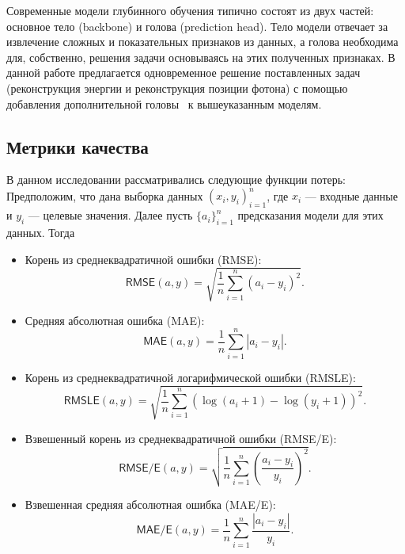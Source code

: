 \documentclass[a4paper,12pt]{extarticle}
\begin{document}
Современные модели глубинного обучения типично состоят из двух частей: основное тело (backbone) и голова (prediction head). Тело модели отвечает за извлечение сложных и показательных признаков из данных, а голова необходима для, собственно, решения задачи основываясь на этих полученных признаках. В данной работе предлагается одновременное решение поставленных задач (реконструкция энергии и реконструкция позиции фотона) с помощью добавления дополнительной головы~\cite{kendall2018multitask, zhang2021survey} к вышеуказанным моделям.

\subsection{Метрики качества}
\label{subsection:metrics}

В данном исследовании рассматривались следующие функции потерь: Предположим, что дана выборка данных $(x_i, y_i)_{i = 1}^{n}$, где $x_i$ --- входные данные и $y_i$ --- целевые значения. Далее пусть $\{ a_i \}_{i = 1}^{n}$ предсказания модели для этих данных. Тогда

\begin{itemize}
    \item Корень из среднеквадратичной ошибки (\textsf{RMSE}): \[ \textsf{RMSE}(a, y) = \sqrt{\frac{1}{n} \sum_{i = 1}^{n} (a_i - y_i)^2} . \]
    \item Средняя абсолютная ошибка (\textsf{MAE}): \[ \textsf{MAE}(a, y) = \frac{1}{n} \sum_{i = 1}^{n} |a_i - y_i| . \]
    \item Корень из среднеквадратичной логарифмической ошибки (\textsf{RMSLE}): \[ \textsf{RMSLE}(a, y) = \sqrt{\frac{1}{n} \sum_{i = 1}^{n} (\log(a_i + 1) - \log(y_i + 1))^2} . \]
    \item Взвешенный корень из среднеквадратичной ошибки (\textsf{RMSE/E}): \[ \textsf{RMSE/E}(a, y) = \sqrt{\frac{1}{n} \sum_{i = 1}^{n} \left( \frac{a_i - y_i}{y_i} \right)^2} . \]
    \item Взвешенная средняя абсолютная ошибка (\textsf{MAE/E}): \[ \textsf{MAE/E}(a, y) = \frac{1}{n} \sum_{i = 1}^{n} \frac{|a_i - y_i|}{y_i} . \]
\end{itemize}
\end{document}
